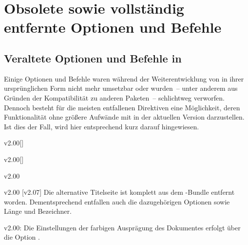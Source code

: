 \chapter{%
  Obsolete sowie vollständig entfernte Optionen und Befehle%
  \label{sec:obsolete}%
}
\section{%
  Veraltete Optionen und Befehle in \TUDScript%
}
Einige Optionen und Befehle waren während der Weiterentwicklung von \TUDScript
in ihrer ursprünglichen Form nicht mehr umsetzbar oder wurden~-- unter anderem 
aus Gründen der Kompatibilität zu anderen Paketen~-- schlichtweg verworfen. 
Dennoch besteht für die meisten entfallenen Direktiven eine Möglichkeit, deren 
Funktionalität ohne größere Aufwände mit \TUDScript in der aktuellen Version 
\vTUDScript{} darzustellen. Ist dies der Fall, wird hier entsprechend kurz 
darauf hingewiesen.

\NewDocumentCommand{}


%
\begin{Obsolete}{v2.00}[]{}
\begin{Obsolete}{v2.00}[]{}
\begin{Obsolete}{v2.00}{}
\begin{Obsolete}{v2.00}{}
\printobsoletelist%
%
[v2.07]%
Die alternative Titelseite ist komplett aus dem \TUDScript-Bundle entfernt 
worden. Dementsprechend entfallen auch die dazugehörigen Optionen sowie Länge 
und Bezeichner.
\end{Obsolete}
\end{Obsolete}
\end{Obsolete}
\end{Obsolete}

\begin{Obsolete}{v2.00:}{}
\printobsoletelist%
%
Die Einstellungen der farbigen Ausprägung des Dokumentes erfolgt über die 
Option .
\end{Obsolete}

